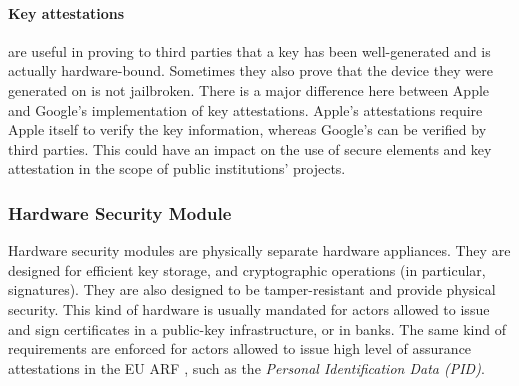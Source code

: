 \paragraph{Key attestations} are useful in proving to third parties that a key has been well-generated and is actually hardware-bound. Sometimes they also prove that the device they were generated on is not jailbroken. There is a major difference here between Apple and Google's implementation of key attestations. Apple's attestations require Apple itself to verify the key information, whereas Google's can be verified by third parties. This could have an impact on the use of secure elements and key attestation in the scope of public institutions' \eid projects.

\subsubsection{Hardware Security Module} 

Hardware security modules are physically separate hardware appliances. They are designed for efficient key storage, and cryptographic operations (in particular, signatures). They are also designed to be tamper-resistant and provide physical security. This kind of hardware is usually mandated for actors allowed to issue and sign certificates in a public-key infrastructure, or in banks. The same kind of requirements are enforced for actors allowed to issue high level of assurance attestations in the EU ARF \cite{EUDI-ARF}, such as the \emph{Personal Identification Data (PID)}.

